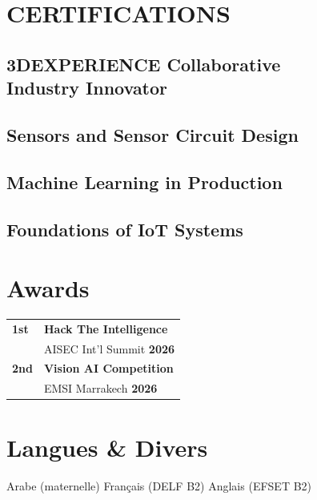 \documentclass[]{plushcv}
\begin{document}
\begin{minipage}[t]{0.24\textwidth}
\vspace{4pt}
\section{CERTIFICATIONS}
\sectionsep

\subsection{3DEXPERIENCE Collaborative \\ Industry Innovator}
\vspace*{2pt}

\subsection{Sensors and Sensor Circuit Design}
\vspace*{2pt}

\subsection{Machine Learning in Production}
\vspace*{2pt}

\subsection{Foundations of IoT Systems}
\sectionsep
\vspace{2pt}
\section{Awards}
\begin{tabular}{@{}p{0.5cm} p{3.8cm}}
\textbf{\large 1st} & \textbf{Hack The Intelligence} \\
 & {\footnotesize AISEC Int'l Summit \textbf{2026}} \\[4pt]
\textbf{\large 2nd} & \textbf{Vision AI Competition} \\
 & {\footnotesize EMSI Marrakech \textbf{2026}} \\
\end{tabular}
\vspace{-2pt}
\section{Langues \& Divers}
\vspace{0pt}

\begin{flushleft}
Arabe (maternelle) \textbullet{} Français (DELF B2) \textbullet{} Anglais (EFSET B2)
\end{flushleft}

\end{minipage} 
\end{document}
